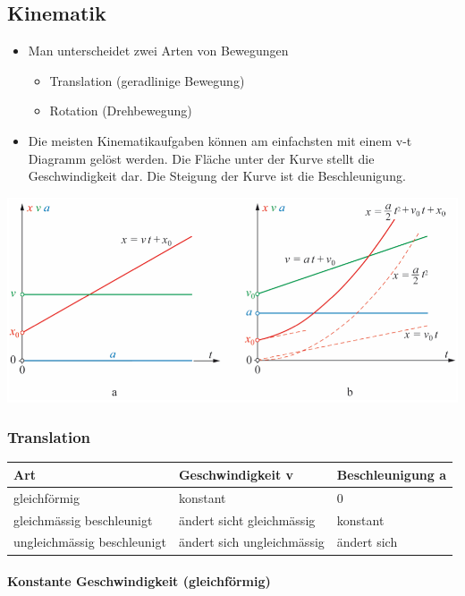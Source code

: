 \documentclass[
a4paper,
oneside,
landscape, 
8pt,
]{scrartcl}
\begin{document}
\begin{multicols*}{2}
\subsection{Kinematik}
\begin{itemize}
	\item Man unterscheidet zwei Arten von Bewegungen
	\begin{itemize}
		\item Translation (geradlinige Bewegung)
		\item Rotation (Drehbewegung)
	\end{itemize}
	\item Die meisten Kinematikaufgaben können am einfachsten mit einem v-t Diagramm gelöst werden. Die Fläche unter der Kurve stellt die Geschwindigkeit dar. Die Steigung der Kurve ist die Beschleunigung.
\end{itemize}


\includegraphics[width=0.7\linewidth]{images/kinematik}

\subsubsection{Translation}
\begin{tabbing}
	\begin{tabu} to \linewidth {X l l}
		\toprule
		Art & Geschwindigkeit v & Beschleunigung a \\
		\midrule
		gleichförmig & konstant & 0 \\
		gleichmässig beschleunigt & ändert sicht gleichmässig & konstant \\
		ungleichmässig beschleunigt & ändert sich ungleichmässig & ändert sich \\
	\end{tabu}
\end{tabbing}


\paragraph{Konstante Geschwindigkeit (gleichförmig)}


\end{multicols*}
\end{document}
